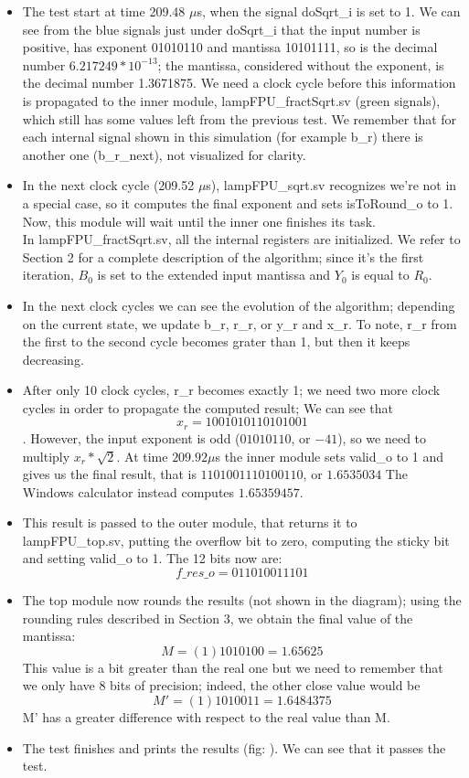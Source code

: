 \begin{itemize}
\item The test start at time 209.48 $\mu$s, when the signal doSqrt\_i is set to 1. We can see from the blue signals just under doSqrt\_i that the input number is positive, has exponent 01010110 and mantissa 10101111, so is the decimal number $6.217249*10^{-13}$; the mantissa, considered without the exponent, is the decimal number 1.3671875. We need a clock cycle before this information is propagated to the inner module, lampFPU\_fractSqrt.sv (green signals), which still has some values left from the previous test. We remember that for each internal signal shown in this simulation (for example b\_r) there is another one (b\_r\_next), not visualized for clarity.
\item In the next clock cycle (209.52 $\mu$s), lampFPU\_sqrt.sv recognizes we're not in a special case, so it computes the final exponent and sets isToRound\_o to 1. Now, this module will wait until the inner one finishes its task.\\
In lampFPU\_fractSqrt.sv, all the internal registers are initialized. We refer to Section 2 for a complete description of the algorithm; since it's the first iteration, $B_0$ is set to the extended input mantissa and $Y_0$ is equal to $R_0$. 
\item In the next clock cycles we can see the evolution of the algorithm; depending on the current state, we update b\_r, r\_r, or y\_r and x\_r. To note, r\_r from the first to the second cycle becomes grater than 1, but then it keeps decreasing.
\item After only 10 clock cycles, r\_r becomes exactly 1; we need two more clock cycles in order to propagate the computed result; We can see that 
$$x_r = 1001010110101001$$.  However, the input exponent is odd ($01010110$, or $-41$), so we need to multiply
$x_r * \sqrt{2}$. At time $209.92 \mu$s the inner module sets valid\_o to 1 and gives us the final result, that is $1101001110100110$, or $1.6535034$ The Windows calculator instead computes $1.65359457$. 
\item This result is passed to the outer module, that returns it to lampFPU\_top.sv, putting the overflow bit to zero, computing the sticky bit and setting valid\_o to 1. The 12 bits now are:
$$f\_res\_o = 011010011101$$ 
\item The top module now rounds the results (not shown in the diagram); using the rounding rules described in Section 3, we obtain the final value of the mantissa:
$$ M = (1)1010100 = 1.65625$$
This value is a bit greater than the real one but we need to remember that we only have 8 bits of precision; indeed, the other close value would be
 $$ M' = (1)1010011 =1.6484375$$
M' has a greater difference with respect to the real value than M. 
\item The test finishes and prints the results (fig: ). We can see that it passes the test.
\end{itemize}
